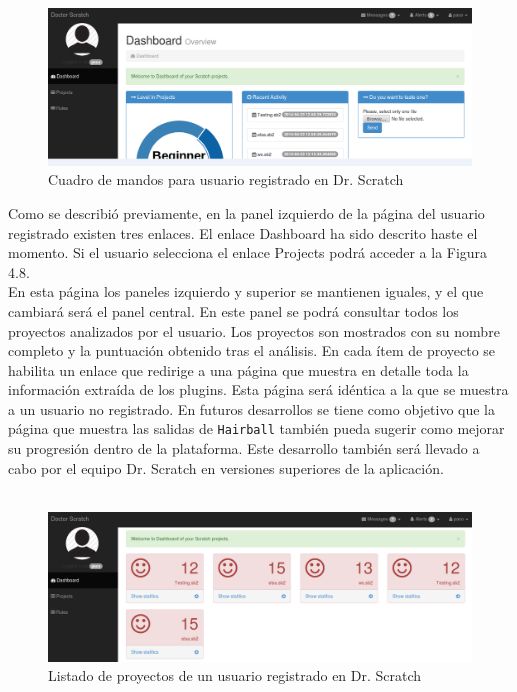\documentclass[a4paper, 12pt]{book}
\begin{document}
\begin{figure}
	\graphicspath{{img/}}
  \includegraphics[bb=0 0 800 600, width=13cm, keepaspectratio]{dashboardprincipal.png}
	\caption{Cuadro de mandos para usuario registrado en Dr. Scratch}
  \label{figura:foro_hilos}
\end{figure}

Como se describió previamente, en la panel izquierdo de la página del usuario registrado 
existen tres enlaces. El enlace Dashboard ha sido descrito haste el momento. Si el usuario
selecciona el enlace Projects podrá acceder a la Figura 4.8.  \\


En esta página los paneles izquierdo y superior se mantienen iguales, y el que cambiará será
el panel central. En este panel se podrá consultar todos los proyectos analizados por el usuario. 
Los proyectos son mostrados con su nombre completo y la puntuación obtenido tras el análisis. 
En cada ítem de proyecto se habilita un enlace que redirige a una página que muestra en detalle
toda la información extraída de los plugins. Esta página será idéntica a la que se muestra a un
usuario no registrado. En futuros desarrollos se tiene como objetivo que la página que muestra
las salidas de \texttt{Hairball} también pueda sugerir como mejorar su progresión dentro de la
plataforma. Este desarrollo también será llevado a cabo por el equipo Dr. Scratch en versiones
superiores de la aplicación.  \\ \\ 


\begin{figure}
	\graphicspath{{img/}}
  \includegraphics[bb=0 0 800 600, width=13cm, keepaspectratio]{proyectos.png}
	\caption{Listado de proyectos de un usuario registrado en Dr. Scratch}
  \label{figura:foro_hilos}
\end{figure}
\end{document}
